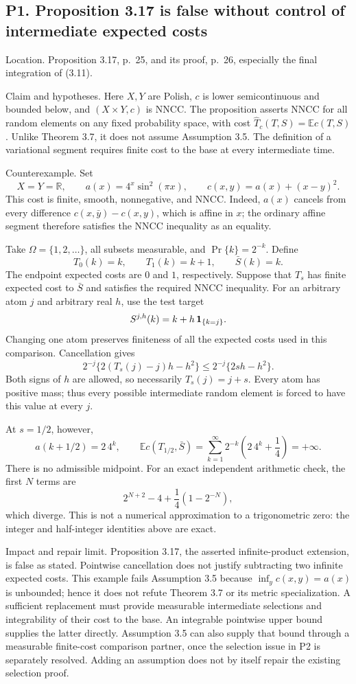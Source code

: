 \documentclass[10pt]{article}
\begin{document}
\subsection*{P1. Proposition 3.17 is false without control of intermediate expected costs}
Location. Proposition 3.17, p. 25, and its proof, p. 26, especially the final integration of (3.11).\par
Claim and hypotheses. Here \(X,Y\) are Polish, \(c\) is lower semicontinuous and bounded below, and \((X\times Y,c)\) is NNCC. The proposition asserts NNCC for all random elements on any fixed probability space, with cost \(\widehat T_c(T,S)=\mathbb Ec(T,S)\). Unlike Theorem 3.7, it does not assume Assumption 3.5. The definition of a variational segment requires finite cost to the base at every intermediate time.\par
Counterexample. Set \[X=Y=\mathbb R,\qquad a(x)=4^x\sin^2(\pi x),\qquad
 c(x,y)=a(x)+(x-y)^2.\] This cost is finite, smooth, nonnegative, and NNCC. Indeed, \(a(x)\) cancels from every difference \(c(x,\bar y)-c(x,y)\), which is affine in \(x\); the ordinary affine segment therefore satisfies the NNCC inequality as an equality.\par
Take \(\Omega=\{1,2,\ldots\}\), all subsets measurable, and \(\Pr\{k\}=2^{-k}\). Define \[T_0(k)=k,\qquad T_1(k)=k+1,\qquad \bar S(k)=k.\] The endpoint expected costs are \(0\) and \(1\), respectively. Suppose that \(T_s\) has finite expected cost to \(\bar S\) and satisfies the required NNCC inequality. For an arbitrary atom \(j\) and arbitrary real \(h\), use the test target \[S^{j,h}(k)=k+h\,{\bf1}_{\{k=j\}}.\] Changing one atom preserves finiteness of all the expected costs used in this comparison. Cancellation gives \[2^{-j}\{2(T_s(j)-j)h-h^2\}
 \le 2^{-j}\{2s h-h^2\}.\] Both signs of \(h\) are allowed, so necessarily \(T_s(j)=j+s\). Every atom has positive mass; thus every possible intermediate random element is forced to have this value at every \(j\).\par
At \(s=1/2\), however, \[a(k+1/2)=2\,4^k,\qquad
 \mathbb Ec(T_{1/2},\bar S)
 =\sum_{k=1}^{\infty}2^{-k}\left(2\,4^k+\frac14\right)=+\infty.\] There is no admissible midpoint. For an exact independent arithmetic check, the first \(N\) terms are \[2^{N+2}-4+\frac14(1-2^{-N}),\] which diverge. This is not a numerical approximation to a trigonometric zero: the integer and half-integer identities above are exact.\par
Impact and repair limit. Proposition 3.17, the asserted infinite-product extension, is false as stated. Pointwise cancellation does not justify subtracting two infinite expected costs. This example fails Assumption 3.5 because \(\inf_y c(x,y)=a(x)\) is unbounded; hence it does not refute Theorem 3.7 or its metric specialization. A sufficient replacement must provide measurable intermediate selections and integrability of their cost to the base. An integrable pointwise upper bound supplies the latter directly. Assumption 3.5 can also supply that bound through a measurable finite-cost comparison partner, once the selection issue in P2 is separately resolved. Adding an assumption does not by itself repair the existing selection proof.\par
\end{document}
